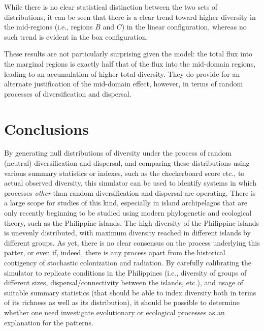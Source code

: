 \documentclass[11pt]{article}
\begin{document}
While there is no clear statistical distinction between the two sets of distributions, it can be seen that there is a clear trend toward higher diversity in the mid-regions (i.e., regions $B$ and $C$) in the linear configuration, whereas no such trend is evident in the box configuration.

These results are not particularly surprising given the model: the total flux into the marginal regions is exactly half that of the flux into the mid-domain regions, leading to an accumulation of higher total diversity.
They do provide for an alternate justification of the mid-domain effect, however, in terms of random processes of diversification and dispersal.

\section*{Conclusions}

By generating null distributions of diversity under the process of random (neutral) diversification and dispersal, and comparing these distributions using various summary statistics or indexes, such as the checkerboard score etc., to actual observed diversity, this simulator can be used to identify systems in which processes \textit{other} than random diversification and dispersal are operating.
There is a large scope for studies of this kind, especially in island archipelagos that are only recently beginning to be studied using modern phylogenetic and ecological theory, such as the Philippine islands.
The high diversity of the Philippine islands is unevenly distributed, with maximum diversity reached in different islands by different groups.
As yet, there is no clear consensus on the process underlying this patter, or even if, indeed, there is any process apart from the historical contigency of stochastic colonization and radiation.
By carefully calibrating the simulator to replicate conditions in the Philippines (i.e., diversity of groups of different sizes, dispersal/connectivity between the islands, etc.), and usage of suitable summary statistics (that should be able to index diversity both in terms of its richness as well as its distribution), it should be possible to determine whether one need investigate evolutionary or ecological processes as an explanation for the patterns.
\end{document}

